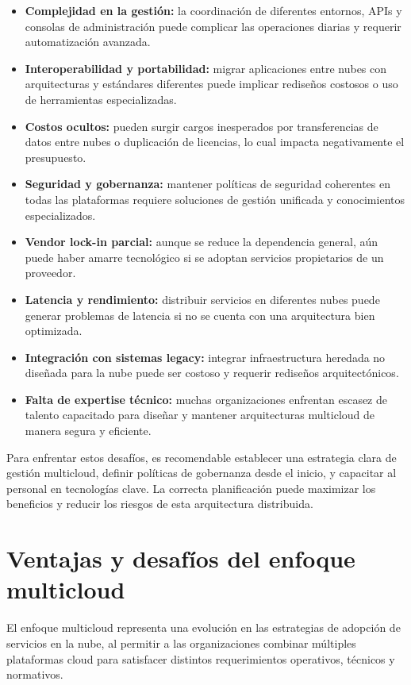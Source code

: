 {            \begin{itemize}
                \item \textbf{Complejidad en la gestión:} la coordinación de diferentes entornos, APIs y consolas de administración puede complicar las operaciones diarias y requerir automatización avanzada.
                \item \textbf{Interoperabilidad y portabilidad:} migrar aplicaciones entre nubes con arquitecturas y estándares diferentes puede implicar rediseños costosos o uso de herramientas especializadas.
                \item \textbf{Costos ocultos:} pueden surgir cargos inesperados por transferencias de datos entre nubes o duplicación de licencias, lo cual impacta negativamente el presupuesto.
                \item \textbf{Seguridad y gobernanza:} mantener políticas de seguridad coherentes en todas las plataformas requiere soluciones de gestión unificada y conocimientos especializados.
                \item \textbf{Vendor lock-in parcial:} aunque se reduce la dependencia general, aún puede haber amarre tecnológico si se adoptan servicios propietarios de un proveedor.
                \item \textbf{Latencia y rendimiento:} distribuir servicios en diferentes nubes puede generar problemas de latencia si no se cuenta con una arquitectura bien optimizada.
                \item \textbf{Integración con sistemas legacy:} integrar infraestructura heredada no diseñada para la nube puede ser costoso y requerir rediseños arquitectónicos.
                \item \textbf{Falta de expertise técnico:} muchas organizaciones enfrentan escasez de talento capacitado para diseñar y mantener arquitecturas multicloud de manera segura y eficiente.
            \end{itemize}
            
            Para enfrentar estos desafíos, es recomendable establecer una estrategia clara de gestión multicloud, definir políticas de gobernanza desde el inicio, y capacitar al personal en tecnologías clave. La correcta planificación puede maximizar los beneficios y reducir los riesgos de esta arquitectura distribuida.

    \section{Ventajas y desafíos del enfoque multicloud}
        El enfoque multicloud representa una evolución en las estrategias de adopción de servicios en la nube, al permitir a las organizaciones combinar múltiples plataformas cloud para satisfacer distintos requerimientos operativos, técnicos y normativos.
        
}
